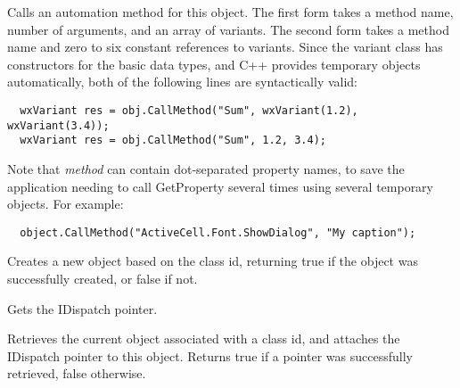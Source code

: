 \label{wxautomationobjectcallmethod}



Calls an automation method for this object. The first form takes a method name, number of
arguments, and an array of variants. The second form takes a method name and zero to six
constant references to variants. Since the variant class has constructors for the basic
data types, and C++ provides temporary objects automatically, both of the following lines
are syntactically valid:

{\small
\begin{verbatim}
  wxVariant res = obj.CallMethod("Sum", wxVariant(1.2), wxVariant(3.4));
  wxVariant res = obj.CallMethod("Sum", 1.2, 3.4);
\end{verbatim}
}

Note that {\it method} can contain dot-separated property names, to save the application
needing to call GetProperty several times using several temporary objects. For example:

{\small
\begin{verbatim}
  object.CallMethod("ActiveCell.Font.ShowDialog", "My caption");
\end{verbatim}
}

\label{wxautomationobjectcreateinstance}


Creates a new object based on the class id, returning true if the object was successfully created,
or false if not.

\label{wxautomationobjectgetdispatchptr}


Gets the IDispatch pointer.

\label{wxautomationobjectgetinstance}


Retrieves the current object associated with a class id, and attaches the IDispatch pointer
to this object. Returns true if a pointer was successfully retrieved, false otherwise.

